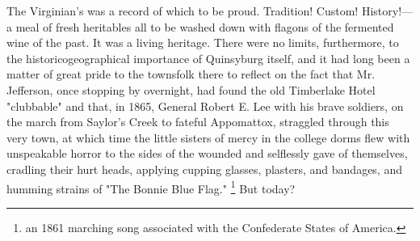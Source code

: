   The Virginian's was a record of which to be proud. Tradition! Custom!
History!---a meal of fresh heritables 
all to be washed down with flagons 
of the fermented wine of the past. It was a living heritage. There were no 
limits, furthermore, to the historicogeographical importance of Quinsyburg 
itself, and it had long been a matter of great pride to the townsfolk there to 
reflect on the fact that Mr. Jefferson, once stopping by overnight, had found 
the old Timberlake Hotel "clubbable" and that, in 1865, General Robert E. Lee 
with his brave soldiers, on the march from Saylor's Creek to fateful Appomattox,
straggled 
through this very town, at which time the little sisters of mercy in
the college dorms flew with unspeakable horror to the sides of the wounded and
selflessly gave of themselves, cradling 
their hurt heads, applying cupping glasses, plasters, and bandages, and humming 
strains of "The Bonnie Blue Flag." 
\footnote{an 1861 marching song associated with the Confederate States of America.}
But today?


